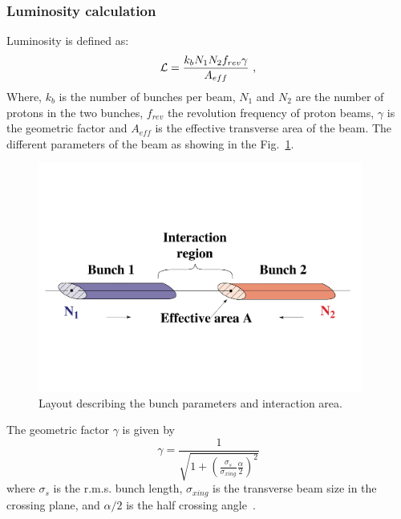 \subsubsection{Luminosity calculation} %
\label{ssub:luminosity_calculation}
Luminosity is defined as:
\begin{equation}
    \mathcal{L} = \frac{k_bN_1N_2f_{rev}\gamma}{A_{eff}}~,
\end{equation}
Where, $k_b$ is the number of bunches per beam, $N_1$ and $N_2$ are the number of protons in the two bunches, $f_{rev}$ the revolution frequency of proton beams, $\gamma$ is the geometric factor and $A_{eff}$ is the effective transverse area of the beam. The different parameters of the beam as showing in the Fig.~\ref{fig:lumi}.
\begin{figure}[!htbp]
	\centering
	\includegraphics[width=0.95\textwidth]{figures/LHC/Luminosity_calculation.pdf}
	\caption{Layout describing the bunch parameters and interaction area.}
	\label{fig:lumi}
\end{figure}
The geometric factor $\gamma$ is given by
\begin{equation}
	\gamma = \frac{1}{\sqrt{1+(\frac{\sigma_s}{\sigma_{xing}}\frac{\alpha}{2})^2}}
\end{equation}
where $\sigma_s$ is the r.m.s. bunch length, $\sigma_{xing}$ is the transverse beam size in the crossing plane, and $\alpha/2$ is the half crossing angle~\cite{Hostettler2017}.
